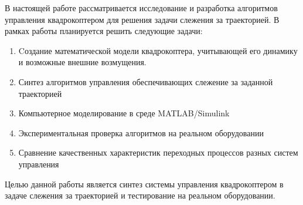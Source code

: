 В настоящей работе рассматривается исследование и разработка 
алгоритмов управления квадрокоптером для решения задачи слежения 
за траекторией. В рамках работы планируется решить следующие задачи:

\begin{enumerate}
    \item Cоздание математической модели квадрокоптера, учитывающей его динамику и возможные 
    внешние возмущения.
    \item Синтез алгоритмов управления обеспечивающих слежение за заданной траекторией
    \item Компьютерное моделирование в среде MATLAB/Simulink
    \item Экспериментальная проверка алгоритмов на реальном 
    оборудовании
    \item Сравнение качественных характеристик переходных процессов разных систем управления
\end{enumerate}



Целью данной работы является синтез системы управления 
квадрокоптером в задаче слежения за траекторией и тестирование на реальном оборудовании.





\endinput

